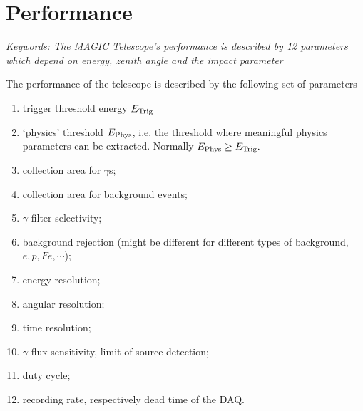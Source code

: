 \clearpage
\newpage
\begin{figure}[t]
\leavevmode
\centering
\epsfxsize=14cm
\end{figure}
\newpage

\setcounter{chapter}{6}

\chapter{Performance}

{\it Keywords: The MAGIC Telescope's performance is described by 12 parameters which
depend on energy, zenith angle and the impact parameter}

\par\medskip
The performance of the telescope is described by the following set of
parameters

\begin{enumerate}
\item  trigger threshold energy $E_{\rm{Trig}}$

\item  `physics' threshold $E_{\rm{Phys}}$, i.e. the threshold where
meaningful physics parameters can be extracted. Normally $E_{\rm{Phys}}\geq E_{%
\rm{Trig}}.$

\item  collection area for $\gamma $s;

\item  collection area for background events;

\item  $\gamma $ filter selectivity;

\item  background rejection (might be different for different types of
background, $e,p,Fe,\cdots $);

\item  energy resolution;

\item  angular resolution;

\item  time resolution;

\item  $\gamma $ flux sensitivity, limit of source detection;

\item  duty cycle;

\item  recording rate, respectively dead time of the DAQ.
\end{enumerate}

